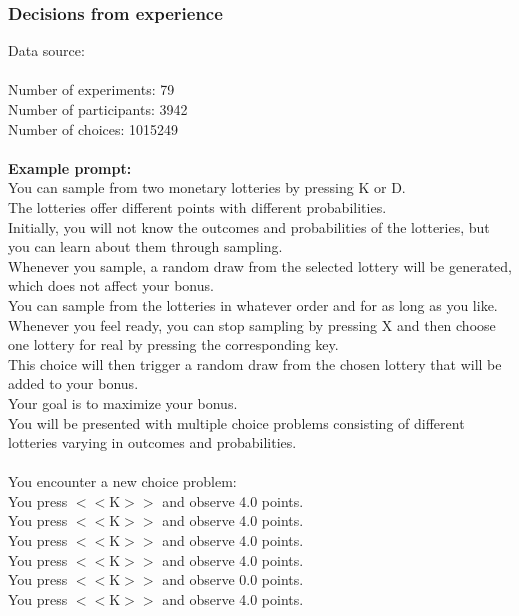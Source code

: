 \documentclass[pdflatex,sn-nature]{sn-jnl}%
\theoremstyle{thmstyleone}%
\theoremstyle{thmstyletwo}%
\theoremstyle{thmstylethree}%
\begin{document}
\subsubsection*{Decisions from experience}
Data source: \cite{wulff2018meta} \\ $~$ \\
Number of experiments: 79 $~$\\ 
Number of participants: 3942 $~$\\ 
Number of choices: 1015249 $~$\\ 
 $~$\\ 
\textbf{Example prompt:}
 $~$\\ 
You can sample from two monetary lotteries by pressing K or D. $~$\\ 
The lotteries offer different points with different probabilities. $~$\\ 
Initially, you will not know the outcomes and probabilities of the lotteries, but you can learn about them through sampling. $~$\\ 
Whenever you sample, a random draw from the selected lottery will be generated, which does not affect your bonus. $~$\\ 
You can sample from the lotteries in whatever order and for as long as you like. $~$\\ 
Whenever you feel ready, you can stop sampling by pressing X and then choose one lottery for real by pressing the corresponding key. $~$\\ 
This choice will then trigger a random draw from the chosen lottery that will be added to your bonus. $~$\\ 
Your goal is to maximize your bonus. $~$\\ 
You will be presented with multiple choice problems consisting of different lotteries varying in outcomes and probabilities. $~$\\ 
 $~$\\ 
You encounter a new choice problem: $~$\\ 
You press $<<$K$>>$ and observe 4.0 points. $~$\\ 
You press $<<$K$>>$ and observe 4.0 points. $~$\\ 
You press $<<$K$>>$ and observe 4.0 points. $~$\\ 
You press $<<$K$>>$ and observe 4.0 points. $~$\\ 
You press $<<$K$>>$ and observe 0.0 points. $~$\\ 
You press $<<$K$>>$ and observe 4.0 points. $~$\\ 
\end{document}
